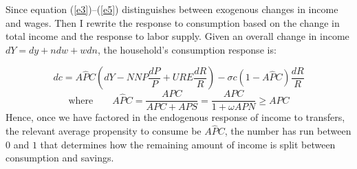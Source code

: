 \documentclass[11pt,letterpaper]{article}
\begin{document}
Since equation (\ref{e3})--(\ref{e5}) distinguishes between exogenous changes in income and wages. Then I rewrite the response to consumption based on the change in total income and the response to labor supply. Given an overall change in income $dY = dy + ndw + wdn$, the household's consumption response is: 


\begin{equation}\label{e7}
dc = A\widehat{P}C \left ( dY - NNP \frac{dP}{P} + URE \frac{dR}{R} \right) - \sigma c (1- A\widehat{P}C)\frac{dR}{R} 
\end{equation}
\vspace{-.7em}
\begin{equation*}
\text{where} \quad \quad A\widehat{P}C = \frac{APC}{APC + APS} = \frac{APC}{1 + \omega APN} \geqslant APC
\end{equation*}
Hence, once we have factored in the endogenous response of income to transfers, the relevant average propensity to consume be $A\widehat{P}C$, the number has run between $0$ and $1$ that determines how the remaining amount of income is split between consumption and savings. 
\end{document}
